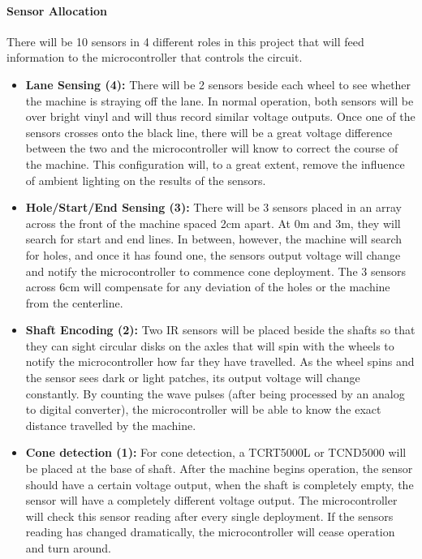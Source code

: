 \documentclass[11pt]{report}
\begin{document}
\paragraph{Sensor Allocation}
There will be 10 sensors in 4 different roles in this project that will feed information to the microcontroller that controls the circuit.
\begin{itemize}
\item{\textbf{Lane Sensing (4):}
There will be 2 sensors beside each wheel to see whether the machine is straying off the lane. In normal operation, both sensors will be over bright vinyl and will thus record similar voltage outputs. Once one of the sensors crosses onto the black line, there will be a great voltage difference between the two and the microcontroller will know to correct the course of the machine. This configuration will, to a great extent, remove the influence of ambient lighting on the results of the sensors.}
\item{\textbf{Hole/Start/End Sensing (3):}
There will be 3 sensors placed in an array across the front of the machine spaced 2cm apart. At 0m and 3m, they will search for start and end lines. In between, however, the machine will search for holes, and once it has found one, the sensors output voltage will change and notify the microcontroller to commence cone deployment. The 3 sensors across 6cm will compensate for any deviation of the holes or the machine from the centerline.}

\item{\textbf{Shaft Encoding (2):}
Two IR sensors will be placed beside the shafts so that they can sight circular disks on the axles that will spin with the wheels to notify the microcontroller how far they have travelled. As the wheel spins and the sensor sees dark or light patches, its output voltage will change constantly. By counting the wave pulses (after being processed by an analog to digital converter), the microcontroller will be able to know the exact distance travelled by the machine.}
\item{\textbf{Cone detection (1):}
For cone detection, a TCRT5000L or TCND5000 will be placed at the base of shaft. After the machine begins operation, the sensor should have a certain voltage output, when the shaft is completely empty, the sensor will have a completely different voltage output. The microcontroller will check this sensor reading after every single deployment. If the sensors reading has changed dramatically, the microcontroller will cease operation and turn around.}
\end{itemize}
\end{document}
